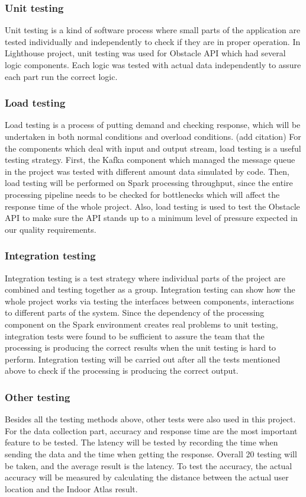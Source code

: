 \documentclass[prodmode,acmtosem]{acmsmall} %
\begin{document}
\subsubsection{Unit testing}
Unit testing is a kind of software process where small parts of the application are tested individually and independently to check if they are in proper operation.\cite{cheon2002simple} In Lighthouse project, unit testing was used for Obstacle API which had several logic components. Each logic was tested with actual data independently to assure each part run the correct logic.

\subsubsection{Load testing}
Load testing is a process of putting demand and checking response, which will be undertaken in both normal conditions and overload conditions. (add citation) For the components which deal with input and output stream, load testing is a useful testing strategy.
First, the Kafka component which managed the message queue in the project was tested with different amount data simulated by code. Then, load testing will be performed on Spark processing throughput, since the entire processing pipeline needs to be checked for bottlenecks which will affect the response time of the whole project. Also, load testing is used to test the Obstacle API to make sure the API stands up to a minimum level of pressure expected in our quality requirements.

\subsubsection{Integration testing}
Integration testing is a test strategy where individual parts of the project are combined and testing together as a group.\cite{jorgensen1994object} Integration testing can show how the whole project works via testing the interfaces between components, interactions to different parts of the system. 
Since the dependency of the processing component on the Spark environment creates real problems to unit testing, integration tests were found to be sufficient to assure the team that the processing is producing the correct results when the unit testing is hard to perform.
Integration testing will be carried out after all the tests mentioned above to check if the processing is producing the correct output.
\subsubsection{Other testing}
Besides all the testing methods above, other tests were also used in this project. For the data collection part, accuracy and response time are the most important feature to be tested. The latency will be tested by recording the time when sending the data and the time when getting the response. Overall 20 testing will be taken, and the average result is the latency. To test the accuracy, the actual accuracy will be measured by calculating the distance between the actual user location and the Indoor Atlas result.
\end{document}
